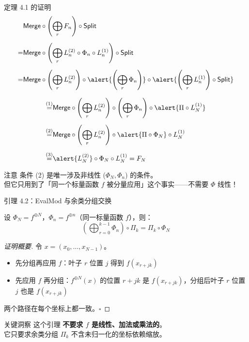 \documentclass[aspectratio=169, 10pt, xcolor=svgnames, table, UTF8]{ctexbeamer}
\newcommand{\splitop}{\mathsf{Split}}
\newcommand{\mergeop}{\mathsf{Merge}}
\begin{document}
\begin{frame}{定理 4.1 的证明}
  \begin{align*}
    &\mergeop \circ \left(\bigoplus_r F_n\right) \circ \splitop \\[0.2cm]
    =&\mergeop \circ \left(\bigoplus_r L_n^{(2)} \circ \Phi_n \circ L_n^{(1)}\right) \circ \splitop \\[0.2cm]
    =&\mergeop \circ \left(\bigoplus_r L_n^{(2)}\right) \circ \alert{\left(\bigoplus_r \Phi_n\right)} \circ \alert{\left(\bigoplus_r L_n^{(1)}\right) \circ \splitop}
  \end{align*}
  
  \pause
  \begin{align*}
    \overset{(1)}{=}& \mergeop \circ \left(\bigoplus_r L_n^{(2)}\right) \circ \left(\bigoplus_r \Phi_n\right) \circ \alert{\Pi \circ L_N^{(1)}} \\[0.2cm]
    \overset{(2)}{=}& \mergeop \circ \left(\bigoplus_r L_n^{(2)}\right) \circ \alert{\Pi \circ \Phi_N} \circ L_N^{(1)} \\[0.2cm]
    \overset{(3)}{=}& \alert{L_N^{(2)}} \circ \Phi_N \circ L_N^{(1)} = F_N
  \end{align*}
  
  \begin{alertblock}{注意}
    条件 (2) 是唯一涉及非线性 (\(\Phi_N, \Phi_n\)) 的条件。\\
    但它只用到了「同一个标量函数 \(f\) 被分量应用」这个事实——不需要 \(\Phi\) 线性！
  \end{alertblock}
\end{frame}

\begin{frame}{引理 4.2：EvalMod 与余类分组交换}
  \begin{lemma}
    设 \(\Phi_N = f^{\oplus N}\)，\(\Phi_n = f^{\oplus n}\)（同一标量函数 \(f\)），则：
    \[
    \boxed{\left(\bigoplus_{r=0}^{k-1} \Phi_n\right) \circ \Pi_k = \Pi_k \circ \Phi_N}
    \]
  \end{lemma}
  
  \pause
  
  \begin{proof}[证明概要]
    令 \(x = (x_0, \ldots, x_{N-1})\)。
    
    \begin{itemize}
      \item 先分组再应用 \(f\)：叶子 \(r\) 位置 \(j\) 得到 \(f(x_{r+jk})\)
      \item 先应用 \(f\) 再分组：\(f^{\oplus N}(x)\) 的位置 \(r+jk\) 是 \(f(x_{r+jk})\)，分组后叶子 \(r\) 位置 \(j\) 也是 \(f(x_{r+jk})\)
    \end{itemize}
    
    两个路径在每个坐标上都一致。\(\square\)
  \end{proof}
  
  \begin{alertblock}{关键洞察}
    这个引理 \textbf{不要求 \(f\) 是线性、加法或乘法的}。\\
    它只要求余类分组 \(\Pi_k\) 不含未归一化的坐标依赖缩放。
  \end{alertblock}
\end{frame}
\end{document}
